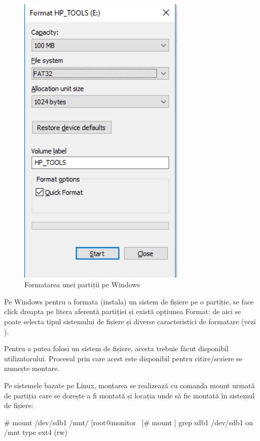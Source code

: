 \begin{figure}[!htbp]
	\centering
	\includegraphics[width=8cm]{chapters/10-storage/img/format-part-img.png}
	\caption{Formatarea unei partiții pe Windows}
	\label{fig:storage-format-part}
\end{figure}

Pe Windows pentru a formata (instala) un sistem de fișiere pe o partiție, se
face click dreapta pe litera aferentă partiției și există opțiunea Format: de
aici se poate selecta tipul sistemului de fișiere și diverse caracteristici de
formatare (vezi ).

Pentru a putea folosi un sistem de fișiere, acesta trebuie făcut disponibil
utilizatorului. Procesul prin care acest este disponibil pentru citire/scriere
se numește montare.

Pe sistemele bazate pe Linux, montarea se realizează cu comanda mount urmată de
partiția care se dorește a fi montată și locația unde să fie montată în sistemul
de fișiere:

\begin{screen}
# mount /dev/sdb1 /mnt/
[root@monitor ~]# mount | grep sdb1
/dev/sdb1 on /mnt type ext4 (rw)
\end{screen}

